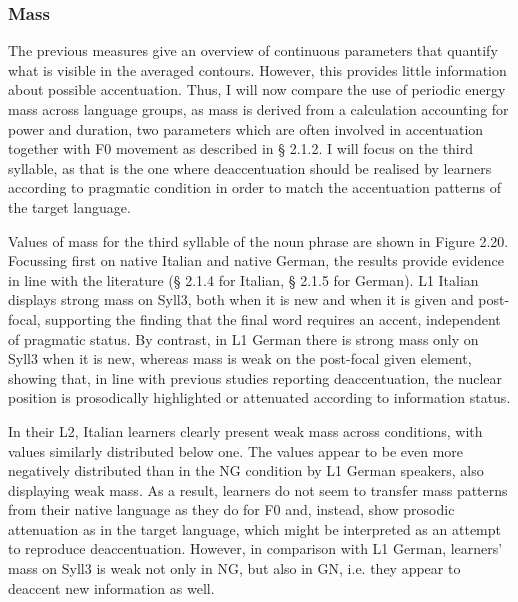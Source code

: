 \subsubsection[Mass]{Mass}
\hypertarget{Toc191305913}{}\begin{styleStandard}
The previous measures give an overview of continuous parameters that quantify what is visible in the averaged contours. However, this provides little information about possible accentuation. Thus, I will now compare the use of periodic energy mass across language groups, as mass is derived from a calculation accounting for power and duration, two parameters which are often involved in accentuation together with F0 movement as described in § 2.1.2. I will focus on the third syllable, as that is the one where deaccentuation should be realised by learners according to pragmatic condition in order to match the accentuation patterns of the target language.
\end{styleStandard}

\begin{styleStandard}
Values of mass for the third syllable of the noun phrase are shown in Figure 2.20. Focussing first on native Italian and native German, the results provide evidence in line with the literature (§ 2.1.4 for Italian, § 2.1.5 for German). L1 Italian displays strong mass on Syll3, both when it is new and when it is given and post-focal, supporting the finding that the final word requires an accent, independent of pragmatic status. By contrast, in L1 German there is strong mass only on Syll3 when it is new, whereas mass is weak on the post-focal given element, showing that, in line with previous studies reporting deaccentuation, the nuclear position is prosodically highlighted or attenuated according to information status.
\end{styleStandard}

\begin{styleStandard}
In their L2, Italian learners clearly present weak mass across conditions, with values similarly distributed below one. The values appear to be even more negatively distributed than in the NG condition by L1 German speakers, also displaying weak mass. As a result, learners do not seem to transfer mass patterns from their native language as they do for F0 and, instead, show prosodic attenuation as in the target language, which might be interpreted as an attempt to reproduce deaccentuation. However, in comparison with L1 German, learners’ mass on Syll3 is weak not only in NG, but also in GN, i.e. they appear to deaccent new information as well.
\end{styleStandard}

